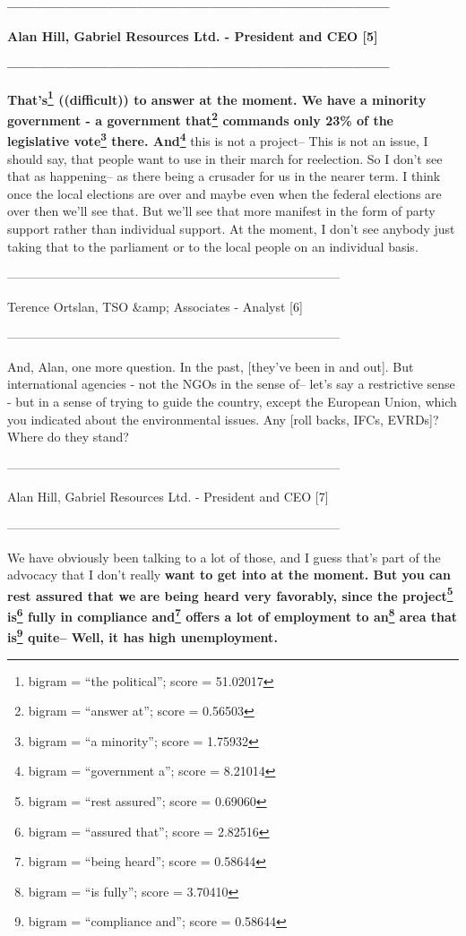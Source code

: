 \documentclass{article}
\begin{document}
 \textbf{--------------------------------------------------------------------------------} 

 \textbf{Alan Hill, Gabriel Resources Ltd. - President and CEO [5]} 

 \textbf{--------------------------------------------------------------------------------} 

 \textbf{That's\footnote{bigram = ``the political''; score = 51.02017} ((difficult)) to answer at the moment. We have a minority government - a government that\footnote{bigram = ``answer at''; score = 0.56503} commands only 23\% of the legislative vote\footnote{bigram = ``a minority''; score = 1.75932} there. And\footnote{bigram = ``government a''; score = 8.21014}} this is not a project-- This is not an issue, I should say, that people want to use in their march for reelection. So I don't see that as happening-- as there being a crusader for us in the nearer term. I think once the local elections are over and maybe even when the federal elections are over then we'll see that. But we'll see that more manifest in the form of party support rather than individual support. At the moment, I don't see anybody just taking that to the parliament or to the local people on an individual basis. 

 -------------------------------------------------------------------------------- 

 Terence Ortslan, TSO \&amp; Associates - Analyst [6] 

 -------------------------------------------------------------------------------- 

 And, Alan, one more question. In the past, [they've been in and out]. But international agencies - not the NGOs in the sense of-- let's say a restrictive sense - but in a sense of trying to guide the country, except the European Union, which you indicated about the environmental issues. Any [roll backs, IFCs, EVRDs]? Where do they stand? 

 -------------------------------------------------------------------------------- 

 Alan Hill, Gabriel Resources Ltd. - President and CEO [7] 

 -------------------------------------------------------------------------------- 

 We have obviously been talking to a lot of those, and I guess that's part of the advocacy that I don't really \textbf{want to get into at the moment. But you can rest assured that we are being heard very favorably, since the project\footnote{bigram = ``rest assured''; score = 0.69060} is\footnote{bigram = ``assured that''; score = 2.82516} fully in compliance and\footnote{bigram = ``being heard''; score = 0.58644} offers a lot of employment to an\footnote{bigram = ``is fully''; score = 3.70410} area that is\footnote{bigram = ``compliance and''; score = 0.58644} quite-- Well, it has high unemployment.} 
\end{document}
